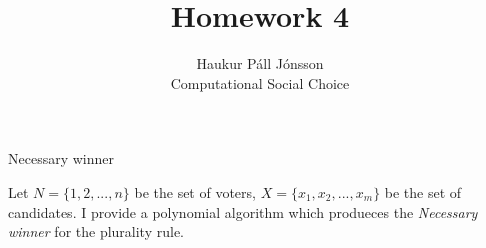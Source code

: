 \documentclass[12pt]{article}
\newenvironment{question}[2][Question]{\begin{trivlist}
\item[\hskip \labelsep {\bfseries #1}\hskip \labelsep {\bfseries #2.}]}{\end{trivlist}}
\begin{document}
\renewcommand{\theenumi}{\roman{enumi}}

\let\oldsum\sum
\renewcommand{\sum}[3]{\oldsum\limits_{#1}^{#2}#3}
\let\oldprod\prod
\renewcommand{\prod}[3]{\oldprod\limits_{#1}^{#2}#3}

\newcommand\Dunion{
  \mathop{\mathchoice
    {\ooalign{$\displaystyle\bigcup$\cr\hss\scalebox{.65}{\raisebox{0.45ex}{\sffamily +}}\hss}}
    {\ooalign{$\textstyle\bigcup$\cr\hss\scalebox{.9}{\raisebox{0.5ex}{\tiny\sffamily +}}\hss}}
    {\ooalign{$\scriptstyle\bigcup$\cr\hss\scalebox{.45}{\raisebox{0.3ex}{\sffamily +}}\hss}}
    {\ooalign{$\scriptscriptstyle\bigcup$\cr\hss\scalebox{.38}{\raisebox{0.3ex}{\sffamily +}}\hss}}
    }
}

\title{Homework 4}
\author{Haukur Páll Jónsson\\
Computational Social Choice}

\maketitle

\begin{question}{1}{Necessary winner}

Let $N=\{1,2, ..., n\}$ be the set of voters, $X=\{x_1,x_2,...,x_m\}$ be the set of candidates.
I provide a polynomial algorithm which produeces the \textit{Necessary winner} for the plurality rule.
\end{question}
\end{document}
